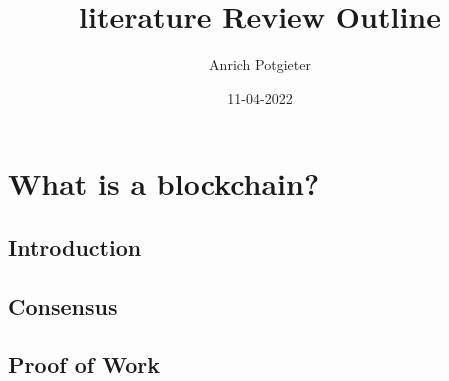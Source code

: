 \documentclass[12pt]{article}
\title{literature Review Outline}
\author{Anrich Potgieter}
\date{11-04-2022}
\begin{document}
\maketitle
\tableofcontents

\section{What is a blockchain?}
\subsection{Introduction}
\subsection{Consensus}
\subsection{Proof of Work}
\end{document}
